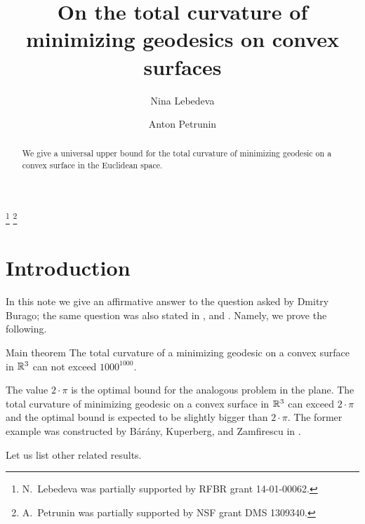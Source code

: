 \documentclass[a4paper,10pt]{amsart}
\begin{document}
\title{On the total curvature of \\
minimizing geodesics on convex surfaces}
\author{Nina Lebedeva}
\address{N. Lebedeva\newline\vskip-4mm
Math. Dept.
St. Petersburg State University,
Universitetsky pr., 28, 
Stary Peterhof, 
198504, Russia.
\newline\vskip-4mm
Steklov Institute,
27 Fontanka, St. Petersburg, 
191023, Russia.}
\author{Anton Petrunin}
\address{A. Petrunin\newline\vskip-4mm
Math. Dept. PSU,
University Park, PA 16802,
USA}
\thanks{N.~Lebedeva was partially supported by RFBR grant 
14-01-00062.}
\thanks{A.~Petrunin was partially supported by NSF grant DMS 1309340.}


\date{}

\begin{abstract}
We give a universal upper bound 
for the total curvature 
of minimizing geodesic 
on a convex surface 
in the Euclidean space.
\end{abstract}
\maketitle

\section{Introduction}


In this note we give an affirmative answer to the question asked by Dmitry Burago; 
the same question was also stated in \cite{AH-PSV}, \cite{pach} and \cite{BKZ}.
Namely, we prove the following.

\begin{thm}{Main theorem}\label{thm:main}
The total curvature of a minimizing geodesic
on a convex surface in $\mathbb{R}^3$ can not exceed $1000^{1000}$.
\end{thm}

The value $2\cdot\pi$ is the optimal bound for the analogous problem in the plane.
The total curvature
of minimizing geodesic on a convex surface in $\mathbb{R}^3$
can exceed $2\cdot\pi$
and the optimal bound 
is expected to be slightly bigger than $2\cdot\pi$.
The former example was constructed by B{\'a}r{\'a}ny,
Kuperberg, 
and Zamfirescu in \cite{BKZ}. 

Let us list other related results.
\end{document}
